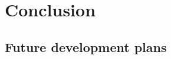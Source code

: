 \documentclass[./main.tex]{subfiles}
\begin{document}
\chapter{Conclusion}

\section{Future development plans}
\end{document}

